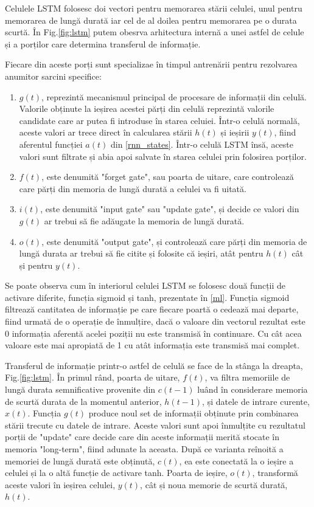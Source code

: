 \documentclass[a4paper,12pt]{book}
\begin{document}
				Celulele LSTM folosesc doi vectori pentru memorarea stării celulei, unul pentru memorarea de lungă durată iar cel de al doilea pentru memorarea pe o durata scurtă. În Fig.\ref{fig:lstm} putem obesrva arhitectura internă a unei astfel de celule și a porților care determina transferul de informație. \par
				Fiecare din aceste porți sunt specializae în timpul antrenării pentru rezolvarea anumitor sarcini specifice:
				\begin{enumerate}
					\item $g(t)$, reprezintă mecanismul principal de procesare de informații din celulă. Valorile obținute la ieșirea acestei părți din celulă reprezintă valorile candidate care ar putea fi introduse în starea celuiei.  Într-o celulă normală, aceste valori ar trece direct în calcularea stării $h(t)$ și ieșirii $y(t)$, fiind aferentul funcției $a(t)$ din \ref{rnn_states}. Într-o celulă LSTM însă, aceste valori sunt filtrate și abia apoi salvate în starea celulei prin folosirea porților.
					\item $f(t)$, este denumită "forget gate", sau poarta de uitare, care controlează care părți din memoria de lungă durată a celulei va fi uitată.
					\item $i(t)$, este denumită "input gate" sau "update gate", și decide ce valori din $g(t)$ ar trebui să fie adăugate la memoria de lungă durată.
					\item $o(t)$, este denumită "output gate", și controlează care părți din memoria de lungă durata ar trebui să fie citite și folosite că ieșiri, atât pentru $h(t)$ cât și pentru $y(t)$. 
				\end{enumerate}
				Se poate observa cum în interiorul celulei LSTM se folosesc două funcții de activare diferite, funcția sigmoid și tanh, prezentate în \ref{ml}. Funcția sigmoid filtrează cantitatea de informație pe care fiecare poartă o cedează mai departe, fiind urmată de o operație de înmulțire, dacă o valoare din vectorul rezultat este 0 informația aferentă acelei poziții nu este transmisă în continuare. Cu cât acea valoare este mai apropiată de 1 cu atât informația este transmisă mai complet. \par
				Transferul de informație printr-o astfel de celulă se face de la stânga la dreapta, Fig.\ref{fig:lstm}. În primul rând, poarta de uitare, $f(t)$, va filtra memoriile de lungă durata semnificative provenite din $c(t-1)$ luând în considerare memoria de scurtă durata de la momentul anterior, $h(t-1)$, și datele de intrare curente, $x(t)$. Funcția $g(t)$ produce noul set de informații obținute prin combinarea stării trecute cu datele de intrare. Aceste valori sunt apoi înmulțite cu rezultatul porții de "update" care decide care din aceste informații merită stocate în memoria "long-term", fiind adunate la aceasta. După ce varianta reînoită a memoriei de lungă durată este obținută, $c(t)$, ea este conectată la o ieșire a celulei și la o altă funcție de activare tanh. Poarta de ieșire, $o(t)$, transformă aceste valori în ieșirea celulei, $y(t)$, cât și noua memorie de scurtă durată, $h(t)$. \par
				
\end{document}

